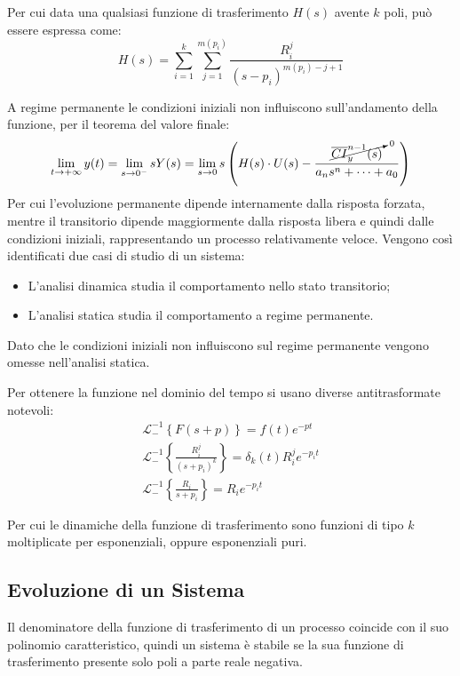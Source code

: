 \documentclass{article}
\numberwithin{equation}{subsection}
\begin{document}
Per cui data una qualsiasi funzione di trasferimento $H(s)$ avente $k$ poli, può essere espressa come:
\begin{equation}
    H(s)=\displaystyle\sum_{i=1}^{k}\sum_{j=1}^{m(p_i)}\frac{R_i^j}{(s-p_i)^{m(p_i)-j+1}}
\end{equation}


A regime permanente le condizioni iniziali non influiscono sull'andamento della funzione, per il teorema del valore finale:
\begin{equation*}
    \displaystyle\lim_{t\to+\infty}y(t)=\lim_{s\to0^-}sY(s)=\lim_{s\to0}s\left(H(s)\cdot U(s)-\frac{\cancelto{0}{\overline{CI}_y^{n-1}(s)}}{a_ns^n+\cdots+a_0}\right)
\end{equation*}
Per cui l'evoluzione permanente dipende internamente dalla risposta forzata, mentre il transitorio dipende maggiormente dalla risposta libera e quindi dalle condizioni iniziali, 
rappresentando un processo relativamente veloce. Vengono così identificati due casi di studio di un sistema:
\begin{itemize}
    \item L'analisi dinamica studia il comportamento nello stato transitorio; 
    \item L'analisi statica studia il comportamento a regime permanente. 
\end{itemize} 
Dato che le condizioni iniziali non influiscono sul regime permanente vengono omesse nell'analisi statica. 

Per ottenere la funzione nel dominio del tempo si usano diverse antitrasformate notevoli:
\begin{gather}
    \mathcal{L}_-^{-1}\left\{F(s+p)\right\}=f(t)e^{-pt}\\
    \mathcal{L}_-^{-1}\left\{\displaystyle\frac{R_i^j}{(s+p_i)^k}\right\}=\delta_k(t)R_i^je^{-p_it}\\
    \mathcal{L}_-^{-1}\left\{\displaystyle\frac{R_i}{s+p_i}\right\}=R_ie^{-p_it}
\end{gather}

Per cui le dinamiche della funzione di trasferimento sono funzioni di tipo $k$ moltiplicate per esponenziali, oppure esponenziali puri. 

\subsection{Evoluzione di un Sistema}

Il denominatore della funzione di trasferimento di un processo coincide con il suo polinomio caratteristico, quindi un sistema è stabile se la sua funzione di trasferimento 
presente solo poli a parte reale negativa. 
\end{document}
